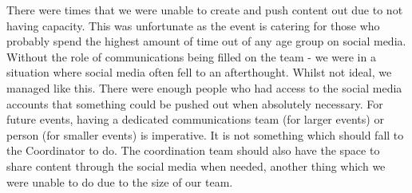 There were times that we were unable to create and push content out due to not having capacity. This was unfortunate as the event is catering for those who probably spend the highest amount of time out of any age group on social media.\\

Without the role of communications being filled on the team - we were in a situation where social media often fell to an afterthought. Whilst not ideal, we managed like this. There were enough people who had access to the social media accounts that something could be pushed out when absolutely necessary. For future events, having a dedicated communications team (for larger events) or person (for smaller events) is imperative. It is not something which should fall to the Coordinator to do. The coordination team should also have the space to share content through the social media when needed, another thing which we were unable to do due to the size of our team.
